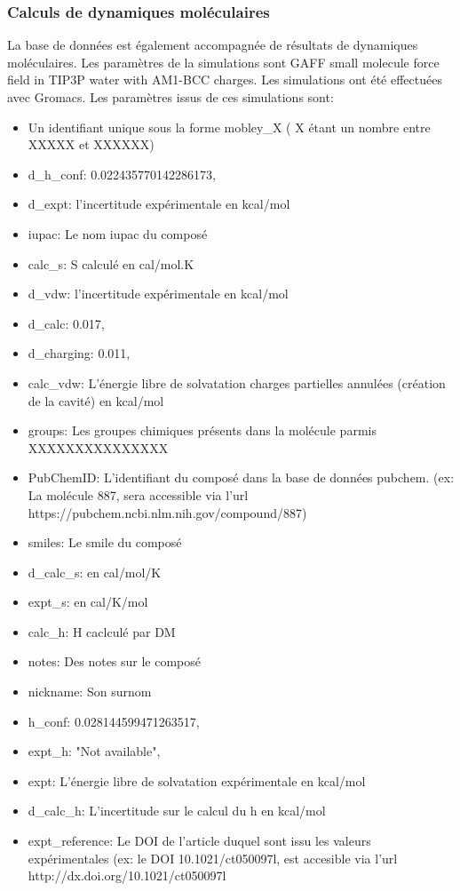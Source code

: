 \subsubsection{Calculs de dynamiques moléculaires}
La base de données est également accompagnée de résultats de dynamiques moléculaires. Les paramètres de la simulations sont GAFF small molecule force field in TIP3P water with AM1-BCC charges. Les simulations ont été effectuées avec Gromacs.
Les paramètres issus de ces simulations sont:
\begin{itemize}
\item Un identifiant unique sous la forme mobley\_X ( X étant un nombre entre XXXXX et XXXXXX)
\item d\_h\_conf: 0.022435770142286173,
\item d\_expt: l'incertitude expérimentale en kcal/mol
\item iupac: Le nom iupac du composé
\item calc\_s: S calculé en cal/mol.K
\item d\_vdw: l'incertitude expérimentale en kcal/mol
\item d\_calc: 0.017,
\item d\_charging: 0.011,
\item calc\_vdw: L'énergie libre de solvatation charges partielles annulées (création de la cavité) en kcal/mol
\item groups: Les groupes chimiques présents dans la molécule parmis XXXXXXXXXXXXXXX
\item PubChemID: L'identifiant du composé dans la base de données pubchem. (ex: La molécule 887, sera accessible via l'url https://pubchem.ncbi.nlm.nih.gov/compound/887)
\item smiles: Le smile du composé
\item d\_calc\_s: en cal/mol/K
\item expt\_s: en cal/K/mol
\item calc\_h: H caclculé par DM
\item notes: Des notes sur le composé
\item nickname: Son surnom
\item h\_conf: 0.028144599471263517,
\item expt\_h: "Not available",
\item expt: L'énergie libre de solvatation expérimentale en kcal/mol
\item d\_calc\_h: L'incertitude sur le calcul du h en kcal/mol
\item expt\_reference: Le DOI de l'article duquel sont issu les valeurs expérimentales (ex: le DOI 10.1021/ct050097l, est accesible via l'url http://dx.doi.org/10.1021/ct050097l

\end{itemize}
